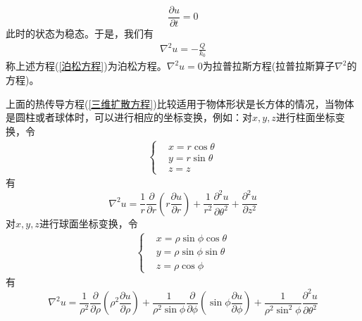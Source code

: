         \[
            \frac{\partial u}{\partial t} = 0
        \]
        此时的状态为稳态。于是，我们有
        \begin{align}
            \label{泊松方程}
            \nabla^2 u = - \frac{Q}{k_0}
        \end{align}
        称上述方程(\ref{泊松方程})为泊松方程。$\nabla^2 u = 0$为拉普拉斯方程(拉普拉斯算子$\nabla^2$的方程)。
        \par
        上面的热传导方程(\ref{三维扩散方程})比较适用于物体形状是长方体的情况，当物体是圆柱或者球体时，可以进行相应的坐标变换，例如：对$x,y,z$进行柱面坐标变换，令
        \begin{align*}
            \left\{
                \begin{aligned}
                    &x = r\cos\theta\\
                    &y = r\sin\theta\\
                    &z = z
                \end{aligned}
            \right.
        \end{align*}
        有
        \[
            \nabla^2 u = \frac{1}{r} \frac{\partial}{\partial r}\left( r \frac{\partial u}{\partial r}\right) +
            \frac{1}{r^2}\frac{\partial^2 u}{\partial \theta ^2} + \frac{\partial^2 u}{\partial z^2}
        \]
        对$x,y,z$进行球面坐标变换，令
        \begin{align*}
            \left\{
                \begin{aligned}
                    &x = \rho\sin \phi\cos\theta\\
                    &y = \rho\sin \phi\sin\theta\\
                    &z = \rho\cos \phi
                \end{aligned}
            \right.
        \end{align*}
        有
        \[
            \nabla^2 u = \frac{1}{\rho^2} \frac{\partial}{\partial \rho } \left( \rho^2 \frac{\partial u}{\partial \rho}\right) +
            \frac{1}{\rho^2 \sin \phi} \frac{\partial}{\partial \phi }\left( \sin \phi\frac{\partial u}{\partial \phi}\right) +
            \frac{1}{\rho^2 \sin ^2\phi} \frac{\partial^2 u}{\partial \theta ^2}
        \]

